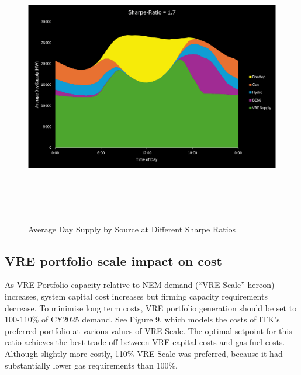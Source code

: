 \documentclass[
  letterpaper,
  DIV=11,
  numbers=noendperiod]{scrartcl}
\begin{document}
\begin{figure}[H]

{\centering \includegraphics[width=7.26806in,height=4.79236in]{./media/media/image13.gif}

}

\caption{Average Day Supply by Source at Different Sharpe Ratios}

\end{figure}%

\subsection{VRE portfolio scale impact on
cost}\label{vre-portfolio-scale-impact-on-cost}

As VRE Portfolio capacity relative to NEM demand (``VRE Scale'' hereon)
increases, system capital cost increases but firming capacity
requirements decrease. To minimise long term costs, VRE portfolio
generation should be set to 100-110\% of CY2025 demand. See Figure 9,
which models the costs of ITK's preferred portfolio at various values of
VRE Scale. The optimal setpoint for this ratio achieves the best
trade-off between VRE capital costs and gas fuel costs. Although
slightly more costly, 110\% VRE Scale was preferred, because it had
substantially lower gas requirements than 100\%.
\end{document}
